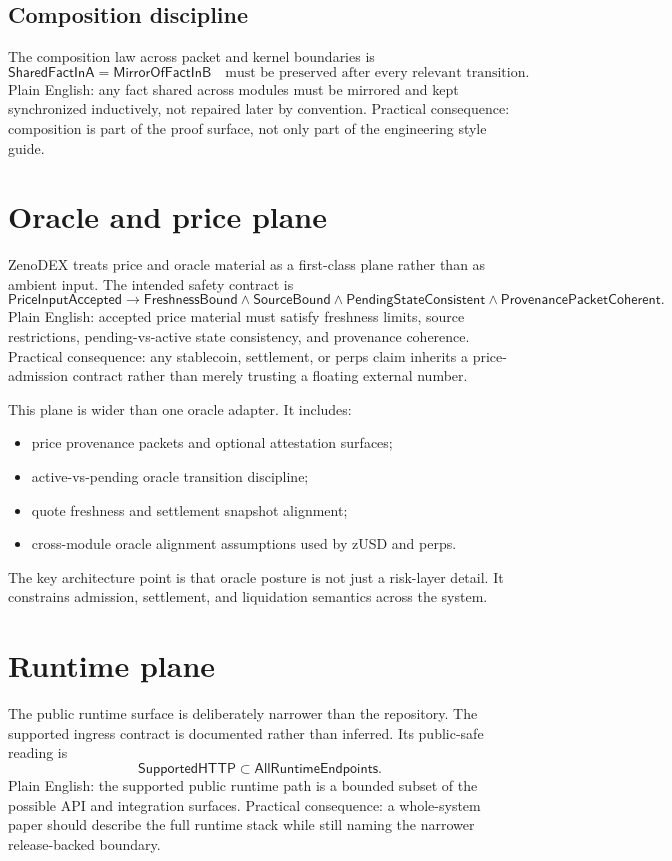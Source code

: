 \documentclass[10pt]{extarticle}
\begin{document}
\subsection{Composition discipline}
The composition law across packet and kernel boundaries is
\[
\mathsf{SharedFactInA} = \mathsf{MirrorOfFactInB}
\quad \text{must be preserved after every relevant transition.}
\]
Plain English: any fact shared across modules must be mirrored and kept
synchronized inductively, not repaired later by convention.
Practical consequence: composition is part of the proof surface, not only part
of the engineering style guide.

\section{Oracle and price plane}
ZenoDEX treats price and oracle material as a first-class plane rather than as
ambient input. The intended safety contract is
\[
\mathsf{PriceInputAccepted}
\to \mathsf{FreshnessBound}
\wedge \mathsf{SourceBound}
\wedge \mathsf{PendingStateConsistent}
\wedge \mathsf{ProvenancePacketCoherent}.
\]
Plain English: accepted price material must satisfy freshness limits, source
restrictions, pending-vs-active state consistency, and provenance coherence.
Practical consequence: any stablecoin, settlement, or perps claim inherits a
price-admission contract rather than merely trusting a floating external
number.

This plane is wider than one oracle adapter. It includes:
\begin{itemize}
  \item price provenance packets and optional attestation surfaces;
  \item active-vs-pending oracle transition discipline;
  \item quote freshness and settlement snapshot alignment;
  \item cross-module oracle alignment assumptions used by zUSD and perps.
\end{itemize}

The key architecture point is that oracle posture is not just a risk-layer
detail. It constrains admission, settlement, and liquidation semantics across
the system.

\section{Runtime plane}
The public runtime surface is deliberately narrower than the repository.
The supported ingress contract is documented rather than inferred.
Its public-safe reading is
\[
\mathsf{SupportedHTTP} \subset \mathsf{AllRuntimeEndpoints}.
\]
Plain English: the supported public runtime path is a bounded subset of the
possible API and integration surfaces.
Practical consequence: a whole-system paper should describe the full runtime
stack while still naming the narrower release-backed boundary.
\end{document}
